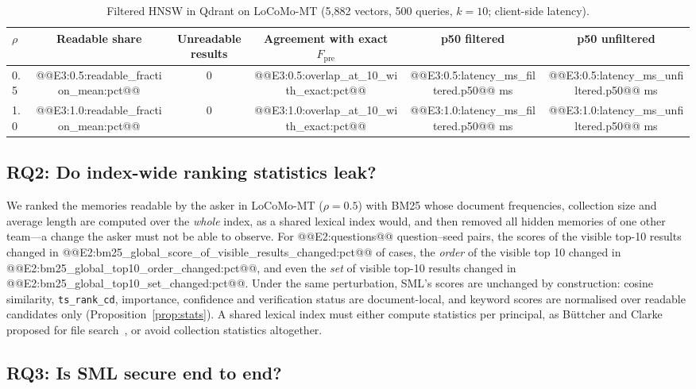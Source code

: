 \documentclass[11pt,a4paper]{article}
\theoremstyle{remark}
\newcommand{\sys}{SML}
\begin{document}
\begin{table}[htbp]
\centering
\small
\caption{Filtered HNSW in Qdrant on LoCoMo-MT (5{,}882 vectors, 500 queries, $k=10$; client-side latency).}
\label{tab:e3}
\begin{tabular}{@{}lccccc@{}}
\toprule
$\rho$ & Readable share & Unreadable results & Agreement with exact $F_{\mathrm{pre}}$ & p50 filtered & p50 unfiltered \\
\midrule
0.5 & @@E3:0.5:readable_fraction_mean:pct@@ & 0 & @@E3:0.5:overlap_at_10_with_exact:pct@@ & @@E3:0.5:latency_ms_filtered.p50@@ ms & @@E3:0.5:latency_ms_unfiltered.p50@@ ms \\
1.0 & @@E3:1.0:readable_fraction_mean:pct@@ & 0 & @@E3:1.0:overlap_at_10_with_exact:pct@@ & @@E3:1.0:latency_ms_filtered.p50@@ ms & @@E3:1.0:latency_ms_unfiltered.p50@@ ms \\
\bottomrule
\end{tabular}
\end{table}

\subsection{RQ2: Do index-wide ranking statistics leak?}
\label{sec:rq2}

We ranked the memories readable by the asker in LoCoMo-MT ($\rho=0.5$) with BM25 whose document frequencies, collection
size and average length are computed over the \emph{whole} index, as a shared lexical index would, and then removed
all hidden memories of one other team---a change the asker must not be able to observe. For
@@E2:questions@@ question--seed pairs, the scores of the visible top-10 results changed in
@@E2:bm25_global_score_of_visible_results_changed:pct@@ of cases, the \emph{order} of the visible top 10 changed in
@@E2:bm25_global_top10_order_changed:pct@@, and even the \emph{set} of visible top-10 results changed in
@@E2:bm25_global_top10_set_changed:pct@@. Under the same perturbation, \sys{}'s scores are unchanged by construction: cosine
similarity, \texttt{ts\_rank\_cd}, importance, confidence and verification status are document-local, and keyword scores
are normalised over readable candidates only (Proposition~\ref{prop:stats}). A shared lexical index must either compute
statistics per principal, as B{\"u}ttcher and Clarke proposed for file search~\cite{buettcher2005security}, or avoid
collection statistics altogether.

\subsection{RQ3: Is \sys{} secure end to end?}
\label{sec:rq3}
\end{document}

